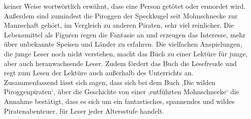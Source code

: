 keiner Weise wortwörtlich erwähnt, dass eine Person getötet oder ermordet wird. Außerdem sind zumindest die Piroggen der Speckkugel seit Mohnschnecke zur Mannschaft gehört, im Vergleich zu anderen Piraten, sehr viel reinlicher. Die Lebensmittel als Figuren regen die Fantasie an und erzeugen das Interesse, mehr über unbekannte Speisen und Länder zu erfahren. Die vielfachen Anspielungen, die junge Leser noch nicht verstehen, macht das Buch zu einer Lektüre für junge, aber auch heranwachsende Leser. Zudem fördert das Buch die Lesefreude und regt zum Lesen der Lektüre auch außerhalb des Unterrichts an.
\\
Zusammenfassend lässt sich sagen, dass sich bei dem Buch ‚Die wilden Piroggenpiraten‘, über die Geschichte von einer ‚entführten Mohnschnecke‘ die Annahme bestätigt, dass es sich um ein fantastisches, spannendes und wildes Piratenabenteuer, für Leser jeder Altersstufe handelt.
